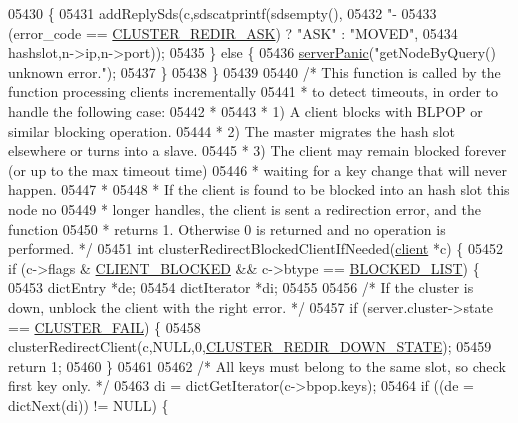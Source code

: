 \begin{DoxyCode}
{{{{{{{{{{{{{{{{{{{{{{{{{{{{{{{{{{{{{{{{{{{{{{{{{{{{{{{{{{{{{{{{{{{{{{{{{{{{{{{{{{{{{{{{{{{{{{{{{{{{{{{{{{{{{05430     \{
05431         addReplySds(c,sdscatprintf(sdsempty(),
05432             \textcolor{stringliteral}{"-%
05433             (error\_code == \hyperlink{cluster_8h_ae93f7d31db8c46cdf4c6a7e2f15fd00b}{CLUSTER\_REDIR\_ASK}) ? \textcolor{stringliteral}{"ASK"} : \textcolor{stringliteral}{"MOVED"},
05434             hashslot,n->ip,n->port));
05435     \} \textcolor{keywordflow}{else} \{
05436         \hyperlink{server_8h_a11cc378e7778a830b41240578de3b204}{serverPanic}(\textcolor{stringliteral}{"getNodeByQuery() unknown error."});
05437     \}
05438 \}
05439 
05440 \textcolor{comment}{/* This function is called by the function processing clients incrementally}
05441 \textcolor{comment}{ * to detect timeouts, in order to handle the following case:}
05442 \textcolor{comment}{ *}
05443 \textcolor{comment}{ * 1) A client blocks with BLPOP or similar blocking operation.}
05444 \textcolor{comment}{ * 2) The master migrates the hash slot elsewhere or turns into a slave.}
05445 \textcolor{comment}{ * 3) The client may remain blocked forever (or up to the max timeout time)}
05446 \textcolor{comment}{ *    waiting for a key change that will never happen.}
05447 \textcolor{comment}{ *}
05448 \textcolor{comment}{ * If the client is found to be blocked into an hash slot this node no}
05449 \textcolor{comment}{ * longer handles, the client is sent a redirection error, and the function}
05450 \textcolor{comment}{ * returns 1. Otherwise 0 is returned and no operation is performed. */}
05451 \textcolor{keywordtype}{int} clusterRedirectBlockedClientIfNeeded(\hyperlink{structclient}{client} *c) \{
05452     \textcolor{keywordflow}{if} (c->flags & \hyperlink{server_8h_a503ad979164a52f0f5e2a63e4c7da3a0}{CLIENT\_BLOCKED} && c->btype == \hyperlink{server_8h_a279f6a31729ba24d6dab0944b82e0b55}{BLOCKED\_LIST}) \{
05453         dictEntry *de;
05454         dictIterator *di;
05455 
05456         \textcolor{comment}{/* If the cluster is down, unblock the client with the right error. */}
05457         \textcolor{keywordflow}{if} (server.cluster->state == \hyperlink{cluster_8h_a4a46e6d5b85c594d08283dc6da2a32bf}{CLUSTER\_FAIL}) \{
05458             clusterRedirectClient(c,NULL,0,\hyperlink{cluster_8h_a62aea13c6a6bad14d00664033b3cae1a}{CLUSTER\_REDIR\_DOWN\_STATE});
05459             \textcolor{keywordflow}{return} 1;
05460         \}
05461 
05462         \textcolor{comment}{/* All keys must belong to the same slot, so check first key only. */}
05463         di = dictGetIterator(c->bpop.keys);
05464         \textcolor{keywordflow}{if} ((de = dictNext(di)) != NULL) \{
}}}}}}}}}}}}}}}}}}}}}}}}}}}}}}}}}}}}}}}}}}}}}}}}}}}}}}}}}}}}}}}}}}}}}}}}}}}}}}}}}}}}}}}}}}}}}}}}}}}}}}}}}}}}}}
\end{DoxyCode}
